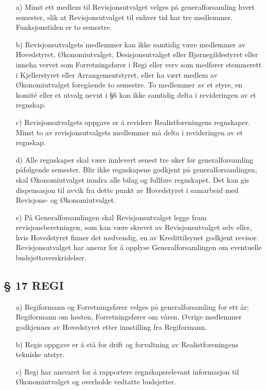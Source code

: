 \begin{itemize}
\item[a)] Minst ett medlem til Revisjonsutvalget velges på generalforsamling
hvert semester, slik at Revisjonsutvalget til enhver tid har tre
medlemmer. Funksjonstiden er to semestre.

\item[b)] Revisjonsutvalgets medlemmer kan ikke samtidig være medlemmer av
Hovedstyret, Økonomiutvalget, Desisjonsutvalget eller Bjørnegildestyret 
eller inneha vervet som Forretningsfører i Regi eller verv som
medfører stemmerett i Kjellerstyret eller Arrangementstyret, eller ha
vært medlem av Økonomiutvalget foregående to semestre. To medlemmer av et 
styre, en komité eller et utvalg nevnt i §6 kan ikke samtidig delta i 
revideringen av et regnskap.

\item[c)] Revisjonsutvalgets oppgave er å revidere Realistforeningens
regnskaper. Minst to av revisjonsutvalgets medlemmer må delta i
revideringen av et regnskap.

\item[d)] Alle regnskaper skal være innlevert senest tre uker før
generalforsamling påfølgende semester. Blir ikke regnskapene godkjent
på generalforsamlingen, skal Økonomiutvalget inndra alle bilag og
fullføre regnskapet. Det kan gis dispensasjon til avvik fra dette
punkt av Hovedstyret i samarbeid med Revisjons- og Økonomiutvalget.

\item[e)] På Generalforsamlingen skal Revisjonsutvalget legge fram
revisjonsberetningen, som kan være skrevet av Revisjonsutvalget selv
eller, hvis Hovedstyret finner det nødvendig, en av Kredittilsynet
godkjent revisor.  Revisjonsutvalget har ansvar for å opplyse
Generalforsamlingen om eventuelle budsjettoverskridelser.
\end{itemize}


\subsection*{§ 17 REGI}

\begin{itemize}
\item[a)] Regiformann og Forretningsfører velges på generalforsamling for ett
år; Regiformann om høsten, Forretningsfører om våren.  Øvrige
medlemmer godkjennes av Hovedstyret etter innstilling fra Regiformann.

\item[b)] Regis oppgave er å stå for drift og forvaltning av
Realistforeningens tekniske utstyr.

\item[c)] Regi har ansvaret for å rapportere regnskapsrelevant
  informasjon til Økonomiutvalget og overholde vedtatte budsjetter.
\end{itemize}


